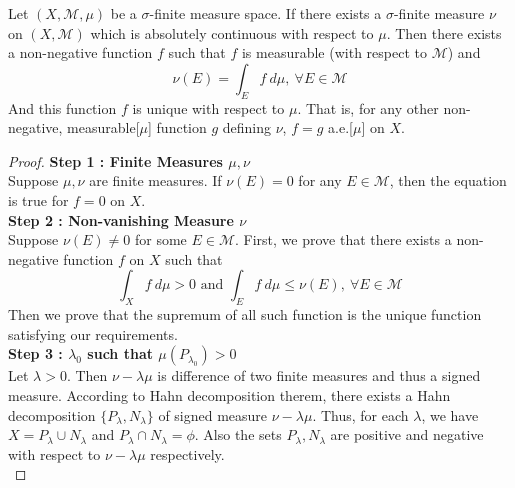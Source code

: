 \begin{theorem}
	Let $(X,\mathcal{M},\mu)$ be a $\sigma$-finite measure space.
	If there exists a $\sigma$-finite measure $\nu$ on $(X,\mathcal{M})$ which is absolutely continuous with respect to $\mu$.
	Then there exists a non-negative function $f$ such that $f$ is measurable (with respect to $\mathcal{M}$) and
	\begin{equation}
		\nu(E) = \int_E f \ d\mu,\ \forall E \in \mathcal{M} 
	\end{equation}
	And this function $f$ is unique with respect to $\mu$. That is, for any other non-negative, measurable[$\mu$] function $g$ defining $\nu$, $f = g$ a.e.[$\mu$] on $X$.
\end{theorem}
\begin{proof}
	\textbf{Step 1 : Finite Measures $\mu,\nu$}\\
	Suppose $\mu,\nu$ are finite measures.
	If $\nu(E) = 0$ for any $E \in \mathcal{M}$, then the equation is true for $f = 0$ on $X$.\\

	\textbf{Step 2 : Non-vanishing Measure $\nu$}\\
	Suppose $\nu(E) \ne 0$ for some $E \in \mathcal{M}$.
	First, we prove that there exists a non-negative function $f$ on $X$ such that
	\[ \int_X f \ d\mu > 0 \text{ and } \int_E f \ d\mu \le \nu(E),\ \forall E \in \mathcal{M} \]
	Then we prove that the supremum of all such function is the unique function satisfying our requirements.\\

	\textbf{Step 3 : $\lambda_0$ such that $\mu(P_{\lambda_0}) > 0$}\\
	Let $\lambda > 0$.
	Then $\nu - \lambda\mu$ is difference of two finite measures and thus a signed measure.
	According to Hahn decomposition therem, there exists a Hahn decomposition $\{ P_\lambda,N_\lambda\}$ of signed measure $\nu - \lambda\mu$.
	Thus, for each $\lambda$, we have $X = P_\lambda \cup N_\lambda$ and $P_\lambda \cap N_\lambda = \phi$.
	Also the sets $P_\lambda, N_\lambda$ are positive and negative with respect to $\nu-\lambda\mu$ respectively.\\


\end{proof}
